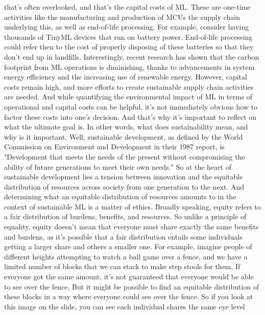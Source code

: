 {{{{{{{{    that's often overlooked, and that's the capital costs of ML.
    These are one-time activities like the manufacturing and production of MCUs
    the supply chain underlying this, as well as end-of-life processing.
    For example, consider having thousands of TinyML devices
    that run on battery power.
    End-of-life processing could refer then to the cost
    of properly disposing of these batteries so that they don't end up in landfills.
    Interestingly, recent research has shown that the carbon footprint from ML
    operations is diminishing, thanks to advancements
    in system energy efficiency and the increasing use of renewable energy.
    However, capital costs remain high, and more efforts
    to create sustainable supply chain activities are needed.
    And while quantifying the environmental impact of ML
    in terms of operational and capital costs can be helpful,
    it's not immediately obvious how to factor these costs into one's decision.
    And that's why it's important to reflect on what the ultimate goal is.
    In other words, what does sustainability mean, and why is it important.
    Well, sustainable development, as defined by the World Commission
    on Environment and Development in their 1987 report,
    is "Development that meets the needs of the present
    without compromising the ability of future generations
    to meet their own needs."
    So at the heart of sustainable development
    lies a tension between innovation and the equitable distribution
    of resources across society from one generation to the next.
    And determining what an equitable distribution of resources
    amounts to in the context of sustainable ML is a matter of ethics.
    Broadly speaking, equity refers to a fair distribution
    of burdens, benefits, and resources.
    So unlike a principle of equality, equity
    doesn't mean that everyone must share exactly the same benefits and burdens,
    as it's possible that a fair distribution entails
    some individuals getting a larger share and others a smaller one.
    For example, imagine people of different heights
    attempting to watch a ball game over a fence,
    and we have a limited number of blocks that we
    can stack to make step stools for them.
    If everyone got the same amount, it's not
    guaranteed that everyone would be able to see over the fence.
    But it might be possible to find an equitable
    distribution of these blocks in a way where
    everyone could see over the fence.
    So if you look at this image on the slide,
    you can see each individual shares the same eye level
}}}}}}}}
